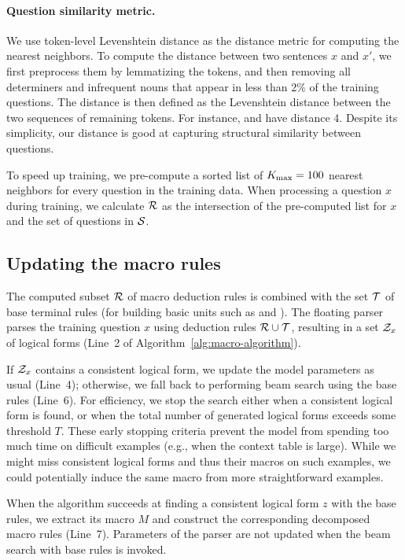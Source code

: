 \paragraph{Question similarity metric.}
We use token-level Levenshtein distance as
the distance metric for computing the nearest neighbors.
To compute the distance between two sentences $x$ and $x'$,
we first preprocess them by lemmatizing the tokens,
and then removing all determiners and infrequent nouns
that appear in less than 2\% of the training questions.
The distance is then defined as the Levenshtein distance
between the two sequences of remaining tokens.
For instance, 
and 
have distance 4.
Despite its simplicity, our distance is good at
capturing structural similarity between questions.

To speed up training,
we pre-compute a sorted list of $K_\mathrm{max} = 100$
nearest neighbors for every question in the training data.
When processing a question $x$ during training,
we calculate $\mathcal{R}$ as
the intersection of the pre-computed list for $x$
and the set of questions in $\mathcal{S}$.

\subsection{Updating the macro rules}
The computed subset $\mathcal{R}$ of macro deduction rules
is combined with the set $\mathcal{T}$ of base terminal rules
(for building basic units such as  and ).
The floating parser parses the training question $x$
using deduction rules $\mathcal{R} \cup \mathcal{T}$,
resulting in a set $\mathcal{Z}_x$ of logical forms
(Line~2 of Algorithm~\ref{alg:macro-algorithm}).

If $\mathcal{Z}_x$ contains a consistent logical form,
we update the model parameters as usual
(Line~4);
otherwise, we fall back to performing
beam search using the base rules
(Line~6).
For efficiency, we stop the search
either when a consistent logical form is found,
or when the total number of generated logical forms
exceeds some threshold $T$.
These early stopping criteria prevent
the model from spending too much time on
difficult examples
(e.g., when the context table is large).
While we might miss consistent logical forms
and thus their macros on such examples,
we could potentially induce the same macro
from more straightforward examples.

When the algorithm succeeds at finding a consistent
logical form $z$ with the base rules,
we extract its macro $M$
and construct the corresponding decomposed macro rules
(Line~7).
Parameters of the parser are not updated
when the beam search with base rules is invoked.

